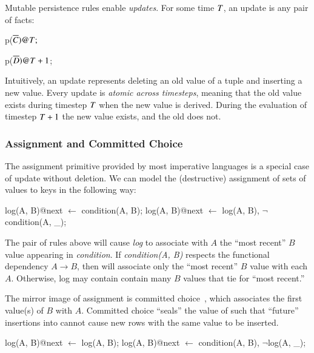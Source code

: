 Mutable persistence rules enable {\em updates}.  For some time $\DT$, an update
is any pair of facts:

\begin{dedalus}
p\nega($\overline{C})@\DT;$
\end{dedalus}

\begin{dedalus}
p($\overline{D})@\DT+1$;
\end{dedalus}


\noindent Intuitively, an update represents deleting an old value of a
tuple and inserting a new value.  Every update is {\em atomic across
  timesteps}, meaning that the old value exists during timestep $\DT$
when the new value is derived.  During the evaluation of timestep
$\DT+1$ the new value exists, and the old does not.

\subsubsection{Assignment and Committed Choice}

The assignment primitive provided by most imperative languages is a special case
of update without deletion.  We can model the (destructive) assignment of sets
of values to keys in the following way:

\begin{Dedalus}
log(A, B)@next \(\leftarrow\) condition(A, B);
log(A, B)@next \(\leftarrow\) log(A, B), \(\lnot\)condition(A, _);
\end{Dedalus}

The pair of rules above will cause {\em log} to associate with $A$ the ``most
recent'' $B$ value appearing in {\em condition}.  If {\em condition(A,
B)} respects the functional dependency $A \to B$, then  will
associate only the ``most recent'' $B$ value with each $A$.  Otherwise, log may contain contain many $B$ values that tie for ``most recent.''

The mirror image of assignment is committed choice~\cite{committedchoice},
which associates the first
value(s) of $B$ with $A$.  Committed choice ``seals'' the value of  such that ``future''
insertions into  cannot cause new rows with the same
 value to be inserted.

\begin{Dedalus}
log(A, B)@next \(\leftarrow\) log(A, B);
log(A, B)@next \(\leftarrow\) condition(A, B), \(\lnot\)log(A, _);
\end{Dedalus}

